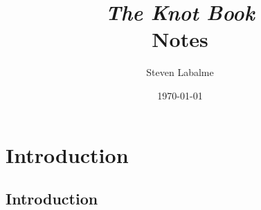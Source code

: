 \documentclass[titlepage]{article}
\title{{\Huge\emph{The Knot Book}}\\[5pt]\textcolor{gray!60!black}{Notes}\vspace{-0.5em}}
\author{Steven Labalme}
\date{\today}
\begin{document}
\maketitle



\tableofcontents
\listoffigures
\listoftables
\newpage



\pagestyle{fancy}
\fancyhf{}
\renewcommand{\headrulewidth}{0pt}
\section{Introduction}
\subsection{Introduction}
\end{document}
